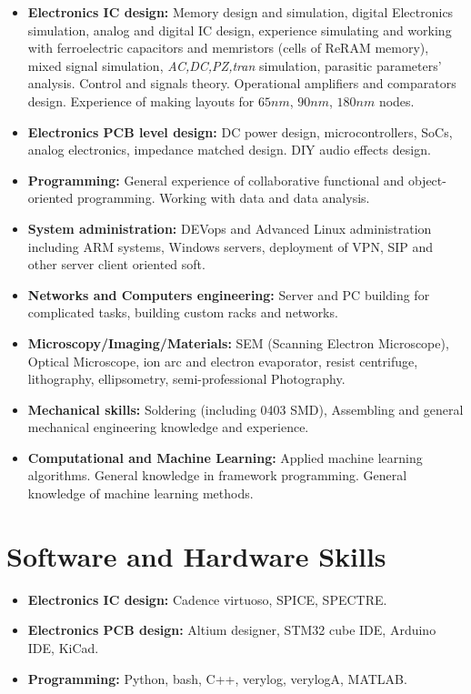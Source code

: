 \documentclass{article}
\begin{document}
\begin{itemize}
\item \textbf{Electronics IC design:} Memory design and simulation, digital Electronics simulation, analog and digital IC design, experience simulating and working with ferroelectric capacitors and memristors (cells of ReRAM memory),   mixed signal simulation, \textit{AC,DC,PZ,tran} simulation, parasitic parameters' analysis. Control and signals theory. Operational amplifiers and comparators design. Experience of making layouts for $65 nm$, $90nm$, $180nm$ nodes. 
\item \textbf{Electronics PCB level design:} DC power design, microcontrollers, SoCs, analog electronics, impedance matched design. DIY audio effects design. 
\item \textbf{Programming:} General experience of collaborative functional and object-oriented programming. Working with data and data analysis.
\item \textbf{System administration:} DEVops and Advanced Linux administration including ARM systems, Windows servers, deployment of VPN, SIP and other server client oriented soft.
\item \textbf{Networks and Computers engineering:} Server and PC building for complicated tasks, building custom racks and networks.
\item \textbf{Microscopy/Imaging/Materials:} SEM (Scanning Electron Microscope), Optical Microscope, ion arc and electron evaporator, resist centrifuge, lithography, ellipsometry, semi-professional Photography.
\item \textbf{Mechanical skills:} Soldering (including 0403 SMD), Assembling and general mechanical engineering knowledge and experience.
\item \textbf{Computational and Machine Learning:} Applied machine learning algorithms. General knowledge in framework programming. General knowledge of machine learning methods.
\end{itemize}
 
\section{Software and Hardware Skills}
\begin{itemize}
\item \textbf{Electronics IC design:} Cadence virtuoso, SPICE, SPECTRE.
\item \textbf{Electronics PCB design:} Altium designer, STM32 cube IDE, Arduino IDE, KiCad.
\item \textbf{Programming:} Python, bash, C++, verylog, verylogA, MATLAB.
\end{itemize}
 
\end{document}
